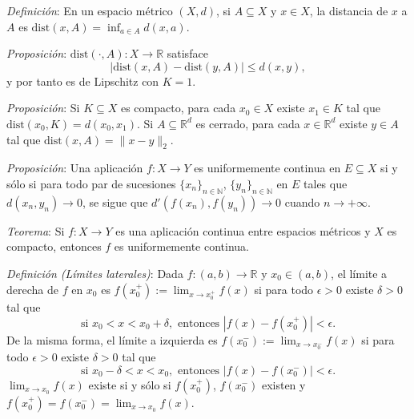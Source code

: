 \documentclass{beamer}
\begin{document}
  \begin{frame}
    \textit{Definición}: En un espacio métrico $(X, d)$, si $A \subseteq X$ y $x \in X$, 
    la distancia de $x$ a $A$ es $\mathrm{dist}(x, A) = \inf_{a \in A} d(x, a)$.
    \newline\newline
    \pause

    \textit{Proposición}: $\mathrm{dist}(\cdot, A): X \to \mathbb{R}$ satisface
    \[
      |\mathrm{dist}(x, A) - \mathrm{dist}(y, A)| \leq d(x, y),
    \]
    y por tanto es de Lipschitz con $K = 1$.
    \newline\newline
    \pause

    \textit{Proposición}: Si $K \subseteq X$ es compacto, para cada $x_0 \in X$ existe 
    $x_1 \in K$ tal que $\mathrm{dist}(x_0, K) = d(x_0, x_1)$. Si $A \subseteq \mathbb{R}^d$ 
    es cerrado, para cada $x \in \mathbb{R}^d$ existe $y \in A$ tal que 
    $\mathrm{dist}(x, A) = \|x - y\|_2$.
  \end{frame}

  \begin{frame}
    \textit{Proposición}: Una aplicación $f: X \to Y$ es uniformemente continua en 
    $E \subseteq X$ si y sólo si para todo par de sucesiones $\{x_n\}_{n \in \mathbb{N}}$, 
    $\{y_n\}_{n \in \mathbb{N}}$ en $E$ tales que $d(x_n, y_n) \to 0$, se sigue que 
    $d'(f(x_n), f(y_n)) \to 0$ cuando $n \to +\infty$.
    \newline\newline
    \pause

    \textit{Teorema}: Si $f: X \to Y$ es una aplicación continua entre espacios métricos 
    y $X$ es compacto, entonces $f$ es uniformemente continua.
  \end{frame}

  \begin{frame}
    \textit{Definición (Límites laterales)}: Dada $f: (a, b) \to \mathbb{R}$ y 
    $x_0 \in (a, b)$, el límite a derecha de $f$ en $x_0$ es $f(x_0^+) := 
    \lim_{x \to x_0^+} f(x)$ si para todo $\epsilon > 0$ existe $\delta > 0$ tal que
    \[
      \text{si } x_0 < x < x_0 + \delta, \text{ entonces } |f(x) - f(x_0^+)| < \epsilon.
    \]
    \pause
    De la misma forma, el límite a izquierda es $f(x_0^-) := \lim_{x \to x_0^-} f(x)$ si 
    para todo $\epsilon > 0$ existe $\delta > 0$ tal que
    \[
      \text{si } x_0 - \delta < x < x_0, \text{ entonces } |f(x) - f(x_0^-)| < \epsilon.
    \]
    \pause
    $\lim_{x \to x_0} f(x)$ existe si y sólo si $f(x_0^+)$, $f(x_0^-)$ existen y 
    $f(x_0^+) = f(x_0^-) = \lim_{x \to x_0} f(x)$.
  \end{frame}
\end{document}
